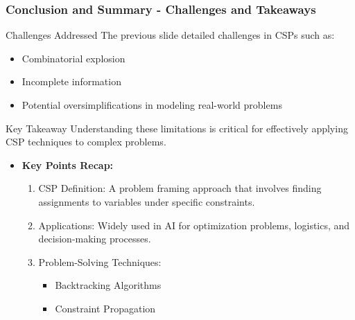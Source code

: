 \documentclass[aspectratio=169]{beamer}
\begin{document}
\begin{frame}[fragile]
    \frametitle{Conclusion and Summary - Challenges and Takeaways}
    \begin{block}{Challenges Addressed}
        The previous slide detailed challenges in CSPs such as:
        \begin{itemize}
            \item Combinatorial explosion
            \item Incomplete information
            \item Potential oversimplifications in modeling real-world problems
        \end{itemize}
    \end{block}

    \begin{block}{Key Takeaway}
        Understanding these limitations is critical for effectively applying CSP techniques to complex problems.
    \end{block}

    \begin{itemize}
        \item \textbf{Key Points Recap:}
        \begin{enumerate}
            \item CSP Definition: A problem framing approach that involves finding assignments to variables under specific constraints.
            \item Applications: Widely used in AI for optimization problems, logistics, and decision-making processes.
            \item Problem-Solving Techniques:
            \begin{itemize}
                \item Backtracking Algorithms
                \item Constraint Propagation
            \end{itemize}
        \end{enumerate}
    \end{itemize}
\end{frame}
\end{document}
